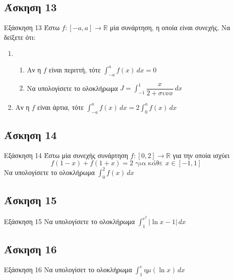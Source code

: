 \documentclass[greek]{beamer}
\begin{document}
\subsection{Άσκηση 13}
\begin{frame}[label=Άσκηση13,t]{Εξάσκηση 13}
 Έστω $f:[-a,a]\to\mathbb{R}$ μία συνάρτηση, η οποία είναι συνεχής. Να δείξετε ότι:
 \begin{enumerate}
   \item
   \begin{enumerate}
     \item<1-> Αν η $f$ είναι περιττή, τότε $\int_{-a}^{a} f(x) \,dx=0$
     \item<2-> Να υπολογίσετε το ολοκλήρωμα $J=\int_{-1}^{1} \dfrac{x}{2+συνx} \,dx$
   \end{enumerate}
   \item<3-> Αν η $f$ είναι άρτια, τότε $\int_{-a}^{a} f(x) \,dx=2\int_{0}^{a} f(x) \,dx$
 \end{enumerate}

\end{frame}

\subsection{Άσκηση 14}
\begin{frame}[label=Άσκηση14,t]{Εξάσκηση 14}
   Έστω μία συνεχής συνάρτηση $f:[0,2]\to\mathbb{R}$ για την οποία ισχύει
   $$f(1-x)+f(1+x)=2\text{ για κάθε }x\in [-1,1]$$
   Να υπολογίσετε το ολοκλήρωμα $\int_{0}^{2} f(x) \,dx$

\end{frame}

\subsection{Άσκηση 15}
\begin{frame}[label=Άσκηση15,t]{Εξάσκηση 15}
  Να υπολογίσετε το ολοκλήρωμα $\int_{1}^{e^2} |\ln x-1| \,dx$

\end{frame}

\subsection{Άσκηση 16}
\begin{frame}[label=Άσκηση16,t]{Εξάσκηση 16}
  Να υπολογίσετ το ολοκλήρωμα $\int_{1}^{e} ημ(\ln x) \,dx$

\end{frame}
\end{document}
